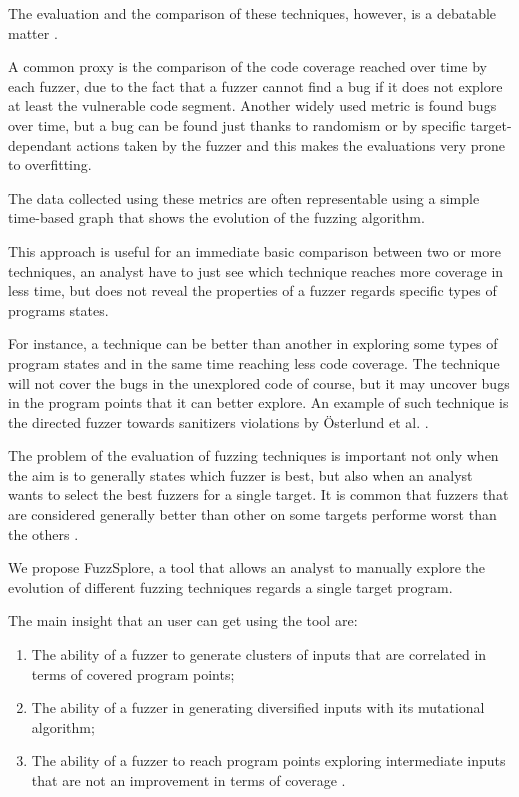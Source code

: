 \documentclass[conference,compsoc]{IEEEtran}
\begin{document}
The evaluation and the comparison of these techniques, however, is a debatable matter \cite{fuzzeval}.

A common proxy is the comparison of the code coverage reached over time by each fuzzer, due to the fact that a fuzzer cannot find a bug if it does not explore at least the vulnerable code segment.
Another widely used metric is found bugs over time, but a bug can be found just thanks to randomism or by specific target-dependant actions taken by the fuzzer and this makes the evaluations very prone to overfitting.

The data collected using these metrics are often representable using a simple time-based graph that shows the evolution of the fuzzing algorithm.

This approach is useful for an immediate basic comparison between two or more techniques, an analyst have to just see which technique reaches more coverage in less time, but does not reveal the properties of a fuzzer regards specific types of programs states.

For instance, a technique can be better than another in exploring some types of program states and in the same time reaching less code coverage.
The technique will not cover the bugs in the unexplored code of course, but it may uncover bugs in the program points that it can better explore.
An example of such technique is the directed fuzzer towards sanitizers violations by \"Osterlund et al. \cite{parmesan}.

The problem of the evaluation of fuzzing techniques is important not only when the aim is to generally states which fuzzer is best, but also when an analyst wants to select the best fuzzers for a single target. It is common that fuzzers that are considered generally better than other on some targets performe worst than the others \cite{aflplusplus}.

We propose {\sc FuzzSplore}, a tool that allows an analyst to manually explore the evolution of different fuzzing techniques regards a single target program.

The main insight that an user can get using the tool are:

\begin{enumerate}
\item The ability of a fuzzer to generate clusters of inputs that are correlated in terms of covered program points;
\item The ability of a fuzzer in generating diversified inputs with its mutational algorithm;
\item The ability of a fuzzer to reach program points exploring intermediate inputs that are not an improvement in terms of coverage \cite{besensitive}.
\end{enumerate}
\end{document}

